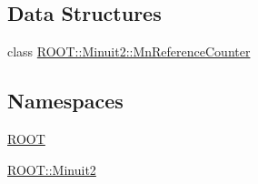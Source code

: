 \subsection*{Data Structures}
\begin{DoxyCompactItemize}
\item 
class \mbox{\hyperlink{classROOT_1_1Minuit2_1_1MnReferenceCounter}{R\+O\+O\+T\+::\+Minuit2\+::\+Mn\+Reference\+Counter}}
\end{DoxyCompactItemize}
\subsection*{Namespaces}
\begin{DoxyCompactItemize}
\item 
 \mbox{\hyperlink{namespaceROOT}{R\+O\+OT}}
\item 
 \mbox{\hyperlink{namespaceROOT_1_1Minuit2}{R\+O\+O\+T\+::\+Minuit2}}
\end{DoxyCompactItemize}
